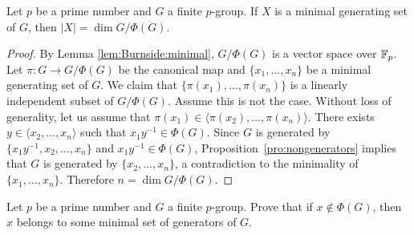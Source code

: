 \begin{theorem}[Burnside]
\label{thm:Burnside:basis}
Let $p$ be a prime number and $G$ a finite $p$-group. If $X$ is a minimal 
generating set of $G$, then $|X|=\dim G/\Phi(G)$. 
\end{theorem}

\begin{proof}
By Lemma \ref{lem:Burnside:minimal}, $G/\Phi(G)$ is a vector space over $\mathbb{F}_p$. 
Let $\pi\colon G\to G/\Phi(G)$ be the canonical map and 
$\{x_1,\dots,x_n\}$ be a minimal generating set of $G$.
We claim that $\{\pi(x_1),\dots,\pi(x_n)\}$ is a linearly independent subset of $G/\Phi(G)$. 
Assume this is not the case. Without loss of generality, let us assume that 
$\pi(x_1)\in\langle \pi(x_2),\dots,\pi(x_n)\rangle$. There exists $y\in
\langle x_2,\dots,x_n\rangle$ such that $x_1y^{-1}\in\Phi(G)$. Since $G$ is generated by 
$\{x_1y^{-1},x_2,\dots,x_n\}$ and $x_1y^{-1}\in\Phi(G)$, Proposition~\ref{pro:nongenerators}
implies that $G$ is generated by 
$\{x_2,\dots,x_n\}$, a contradiction to the minimality of $\{x_1,\dots,x_n\}$. 
Therefore $n=\dim G/\Phi(G)$.
\end{proof}


\begin{exercise}
Let $p$ be a prime number and $G$ a finite $p$-group. Prove that if $x\not\in\Phi(G)$, then 
$x$ belongs to some minimal set of generators of $G$. 
\end{exercise}

